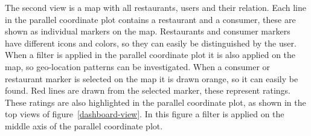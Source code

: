 The second view is a map with all restaurants, users and their relation.
Each line in the parallel coordinate plot contains a restaurant and a consumer, these are shown as individual markers on the map.
Restaurants and consumer markers have different icons and colors, so they can easily be distinguished by the user.
When a filter is applied in the parallel coordinate plot it is also applied on the map, so geo-location patterns can be investigated.
When a consumer or restaurant marker is selected on the map it is drawn orange, so it can easily be found.
Red lines are drawn from the selected marker, these represent ratings.
These ratings are also highlighted in the parallel coordinate plot, as shown in the top views of figure~\ref{dashboard-view}.
In this figure a filter is applied on the middle axis of the parallel coordinate plot.



